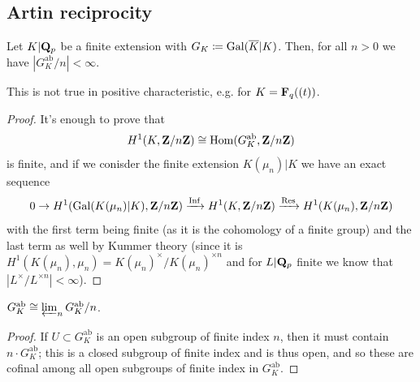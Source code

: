 \documentclass{article}
\begin{document}
\subsection{Artin reciprocity}
\begin{prop}
		Let $K|\mathbf{Q}_p$ be a finite extension with $G_K\coloneqq \operatorname{Gal}(\overline{K}|K)$. Then, for all $n>0$ we have $|G_K^{\text{ab}}/n|<\infty$.
\end{prop}
\begin{rmk}
		This is not true in positive characteristic, e.g. for $K=\mathbf{F}_q((t))$.
\end{rmk}
\begin{proof}
		It's enough to prove that 
		\[
			H^1(K,\mathbf{Z}/n\mathbf{Z})\cong \operatorname{Hom}(G_K^{\text{ab}},\mathbf{Z}/n\mathbf{Z})
		\]
		is finite, and if we conisder the finite extension $K(\mu_n)|K$ we have an exact sequence
		\[
			0 \to H^1(\operatorname{Gal}(K(\mu_n)|K),\mathbf{Z}/n\mathbf{Z}) \xrightarrow{\operatorname{Inf}} H^1(K,\mathbf{Z}/n\mathbf{Z}) \xrightarrow{\operatorname{Res}} H^1(K(\mu_n),\mathbf{Z}/n\mathbf{Z})
		\]
		with the first term being finite (as it is the cohomology of a finite group) and the last term as well by Kummer theory (since it is $H^1(K(\mu_n),\mu_n)= K(\mu_n)^\times / K(\mu_n)^{\times n}$ and for $L|\mathbf{Q}_p$ finite we know that $|L^\times / L^{\times n}|<\infty$).
\end{proof}
\begin{cor}
		$G_K^{\text{ab}}\cong \varprojlim_n G_K^{\text{ab}}/n$.
\end{cor}
\begin{proof}
		If $U\subset G_K^{\text{ab}}$ is an open subgroup of finite index $n$, then it must contain $n\cdot G_K^{\text{ab}}$; this is a closed subgroup of finite index and is thus open, and so these are cofinal among all open subgroups of finite index in $G_K^{\text{ab}}$.
\end{proof}
\end{document}
